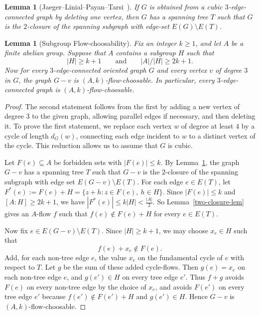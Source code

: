 \documentclass[a4paper,12pt]{article}
\theoremstyle{plain}
\newtheorem{lem}[theorem]{Lemma}
\newtheorem{lemA}[thmA]{Lemma}
\theoremstyle{definition}
\renewcommand\le\leqslant
\renewcommand\ge\geqslant
\begin{document}
\begin{lemA}[Jaeger--Linial--Payan--Tarsi~{\cite[Lemma~3.3]{jaeger-et-al}}]
    \label{truncated-cubic-tree-lem}
    If $G$ is obtained from a cubic $3$-edge-connected graph by deleting one vertex, then $G$ has a spanning tree $T$ such that $G$ is the $2$-closure of the spanning subgraph with edge-set $E(G)\setminus E(T)$.
\end{lemA}

\begin{lem}[Subgroup Flow-choosability]
    \label{subgroup-flow-choosable-lem}
    Fix an integer $k\ge 1$, and let $A$ be a finite abelian group.  Suppose that $A$ contains a subgroup $H$ such that
    \[
        |H|\ge k+1
        \qquad\text{and}\qquad
        {|A|/|H|}\ge 2k+1.
    \]
    Now for every $3$-edge-connected oriented graph $G$ and every vertex $v$ of degree $3$ in $G$, the graph $G-v$ is $(A,k)$-flow-choosable.  In particular, every $3$-edge-connected graph is $(A,k)$-flow-choosable.
\end{lem}
\begin{proof}
    The second statement follows from the first by adding a new vertex of degree $3$ to the given graph, allowing parallel edges if necessary, and then deleting it. To prove the first statement, we replace each vertex $w$ of degree at least $4$ by a cycle of length $d_G(w)$, connecting each edge incident to $w$ to a distinct vertex of the cycle. This reduction allows us to assume that $G$ is cubic. 

    Let $F(e)\subseteq A$ be forbidden sets with $|F(e)|\le k$.  By Lemma~\ref{truncated-cubic-tree-lem}, the graph $G-v$ has a spanning tree $T$ such that $G-v$ is the $2$-closure of the spanning subgraph with edge set $E(G-v)\setminus E(T)$.  For each edge $e\in E(T)$, let
    $
        F^*(e):=F(e)+H=\{z+h:z\in F(e),\ h\in H\}.
    $
    Since $|F(e)|\le k$ and $[A:H]\ge 2k+1$, we have
    $
        |F^*(e)|\le k|H|<\frac{|A|}{2}.$
    So Lemma~\ref{two-closure-lem} gives an $A$-flow $f$ such that
    $
        f(e)\notin F(e)+H
    $ {for every }$e\in E(T)$.
    
    Now fix $e\in E(G-v)\setminus E(T)$.  Since $|H|\ge k+1$, we may choose $x_e\in H$ such that
    \[
        f(e)+x_e\notin F(e).
    \]
    Add, for each non-tree edge $e$, the value $x_e$ on the fundamental cycle of $e$ with respect to $T$.  Let $g$ be the sum of these added cycle-flows.  Then $g(e)=x_e$ on each non-tree edge $e$, and $g(e')\in H$ on every tree edge $e'$.  Thus $f+g$ avoids $F(e)$ on every non-tree edge by the choice of $x_e$, and avoids $F(e')$ on every tree edge $e'$ because $f(e')\notin F(e')+H$ and $g(e')\in H$.  Hence $G-v$ is $(A,k)$-flow-choosable.
\end{proof}
\end{document}
